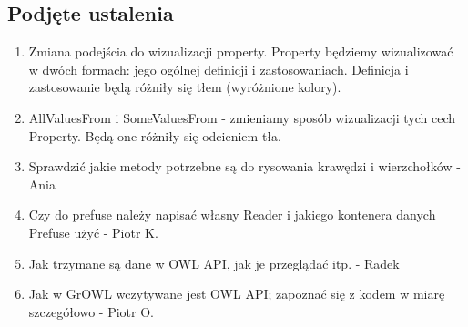 \documentclass[a4paper,10pt]{article}
\begin{document}
\subsection{Podjęte ustalenia}
\begin{enumerate}
\item  Zmiana podejścia do wizualizacji property. Property będziemy wizualizować w dwóch formach: jego ogólnej definicji i zastosowaniach. Definicja i zastosowanie będą różniły się tłem (wyróżnione kolory).
\item  AllValuesFrom i SomeValuesFrom - zmieniamy sposób wizualizacji tych cech Property. Będą one różniły się odcieniem tła.  
\item  Sprawdzić jakie metody potrzebne są do rysowania krawędzi i wierzchołków - Ania
\item  Czy do prefuse należy napisać własny Reader i jakiego kontenera danych Prefuse użyć - Piotr K.
\item  Jak trzymane są dane w OWL API, jak je przeglądać itp. - Radek
\item  Jak w GrOWL wczytywane jest OWL API; zapoznać się z kodem w miarę szczegółowo - Piotr O.
\end{enumerate}



\clearpage
{}
{}

\end{document}
